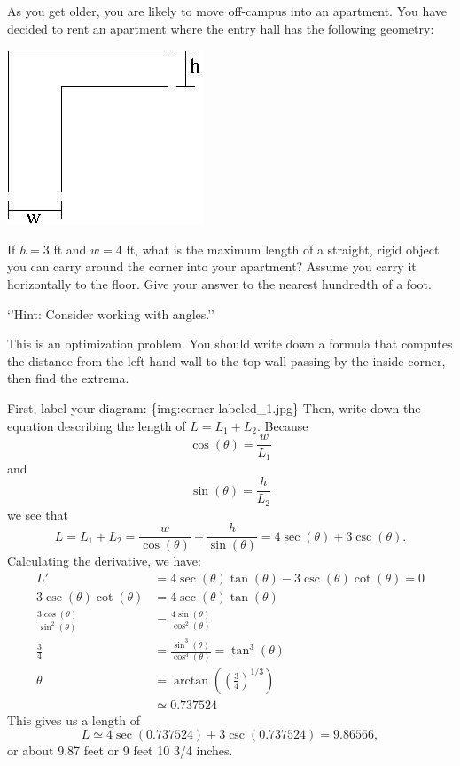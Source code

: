 \documentclass{ximera}
\author{Emma Smith Zbarsky}
\begin{document}
\begin{exercise}

As you get older, you are likely to move off-campus into an apartment.
You have decided to rent an apartment where the entry hall has the
following geometry:

\begin{image}\includegraphics[width=.5\textwidth]{corner.jpg}\end{image}

 If $h=3$ ft and $w=4$ ft, what is
the maximum length of a straight, rigid object you can carry around the
corner into your apartment? Assume you carry it horizontally to the
floor. Give your answer to the nearest hundredth of a foot.

`'Hint: Consider working with angles.''


\begin{hint}
This is an optimization problem. You should write down a formula that
computes the distance from the left hand wall to the top wall passing by
the inside corner, then find the extrema.
\end{hint}


\begin{hint}
First, label your diagram: \{img:corner-labeled\_1.jpg\} Then, write
down the equation describing the length of $L = L_1+L_2$. Because
\[\cos(\theta) = \frac{w}{L_1}\] and \[\sin(\theta) = \frac{h}{L_2}\] we
see that
\[L = L_1+L_2 = \frac{w}{\cos(\theta)}+\frac{h}{\sin(\theta)} = 4\sec(\theta)+3\csc(\theta).\]
Calculating the derivative, we have:
\begin{align*} L' &= 4\sec(\theta)\tan(\theta)-3\csc(\theta) \cot(\theta) = 0 \\
3\csc(\theta)\cot(\theta) &= 4\sec(\theta)\tan(\theta) \\
\frac{3\cos(\theta)}{\sin^2(\theta)} &= \frac{4\sin(\theta)}{\cos^2(\theta)} \\
\frac{3}{4} &= \frac{\sin^3(\theta)}{\cos^3(\theta)} = \tan^3(\theta) \\
\theta &= \arctan\left(\left(\frac{3}{4}\right)^{1/3}\right) \\
& \simeq   0.737524
\end{align*} This gives us a length of
\[L \simeq 4\sec(0.737524)+3\csc(0.737524) = 9.86566,\] or about 9.87
feet or 9 feet 10 3/4 inches.
\end{hint}


\begin{multipleChoice}
\end{multipleChoice}

\end{exercise}
\end{document}
